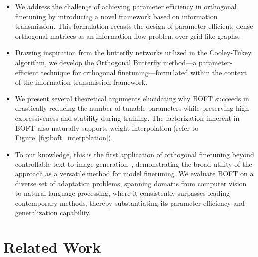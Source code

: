 \begin{itemize}[leftmargin=*,nosep]
    \item We address the challenge of achieving parameter efficiency in orthogonal finetuning by introducing a novel framework based on information transmission. This formulation recasts the design of parameter-efficient, dense orthogonal matrices as an information flow problem over grid-like graphs.
    \item Drawing inspiration from the butterfly networks utilized in the Cooley-Tukey algorithm, we develop the Orthogonal Butterfly method—a parameter-efficient technique for orthogonal finetuning—formulated within the context of the information transmission framework.
    \item We present several theoretical arguments elucidating why BOFT succeeds in drastically reducing the number of tunable parameters while preserving high expressiveness and stability during training. The factorization inherent in BOFT also naturally supports weight interpolation (refer to Figure~\ref{fig:boft_interpolation}).
    \item To our knowledge, this is the first application of orthogonal finetuning beyond controllable text-to-image generation~\cite{qiu2023controlling}, demonstrating the broad utility of the approach as a versatile method for model finetuning. We evaluate BOFT on a diverse set of adaptation problems, spanning domains from computer vision to natural language processing, where it consistently surpasses leading contemporary methods, thereby substantiating its parameter-efficiency and generalization capability.
\end{itemize}

\section{Related Work}

